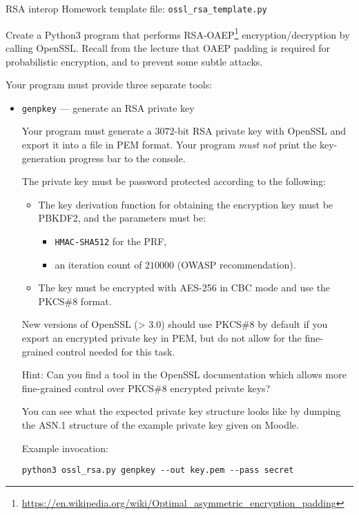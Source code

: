 \documentclass{homework}
\begin{document}
\begin{task}{RSA interop}
  Homework template file: \texttt{ossl\_rsa\_template.py}

  Create a Python3 program that performs RSA-OAEP\footnote{\url{https://en.wikipedia.org/wiki/Optimal_asymmetric_encryption_padding}} encryption/decryption by calling OpenSSL.
  Recall from the lecture that OAEP padding is required for probabilistic encryption, and to prevent some subtle attacks.

  Your program must provide three separate tools:
  \begin{itemize}
    \item \texttt{genpkey} --- generate an RSA private key

    Your program must generate a $3072$-bit RSA private key with OpenSSL and export it into a file in PEM format.
    Your program \emph{must not} print the key-generation progress bar to the console.

    The private key must be password protected according to the following:
    \begin{itemize}
      \item The key derivation function for obtaining the encryption key must be PBKDF2, and the parameters must be:
      \begin{itemize}
        \item \texttt{HMAC-SHA512} for the PRF,
        \item an iteration count of $210000$ (OWASP recommendation).
      \end{itemize}
      \item The key must be encrypted with AES-256 in CBC mode and use the PKCS\#8 format.
    \end{itemize}

    \begin{tcolorbox}[title=Note]
      New versions of OpenSSL (> 3.0) should use PKCS\#8 by default if you export an encrypted private key in PEM, but do not allow for the fine-grained control needed for this task.

      Hint: Can you find a tool in the OpenSSL documentation which allows more fine-grained control over PKCS\#8 encrypted private keys? 
    \end{tcolorbox}

    You can see what the expected private key structure looks like by dumping the ASN.1 structure of the example private key given on Moodle.

    Example invocation:
    \begin{Verbatim}
python3 ossl_rsa.py genpkey --out key.pem --pass secret
    \end{Verbatim}


\end{itemize}
\end{task}
\end{document}
